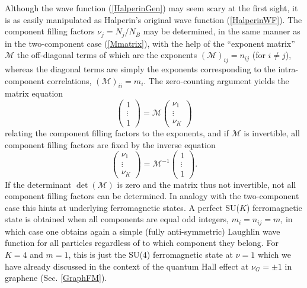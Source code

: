 \documentclass[10pt]{book}
\newcommand{\Mmath}{\mathcal{M}}
\newcommand{\beq}{\begin{equation}}
\newcommand{\eeq}{\end{equation}}
\begin{document}
Although the wave function (\ref{HalperinGen})
may seem scary at the first sight, it is as easily manipulated as Halperin's original wave function
(\ref{HalperinWF}). The component filling factors $\nu_j=N_j/N_B$ may be determined, in the same manner
as in the two-component case (\ref{Mmatrix}), with the help of the ``exponent matrix'' 
$\Mmath$ the off-diagonal terms of which are the exponents $(\Mmath)_{ij}=n_{ij}$ (for $i\neq j$), whereas 
the diagonal terms are simply the exponents corresponding to the intra-component correlations,
$(\Mmath)_{ii}=m_i$. The zero-counting argument yields the matrix equation
\beq\label{MmatrixK}
\left(\begin{array}{c} 1 \\ \vdots \\ 1\end{array}\right) = \Mmath
\left(\begin{array}{c} \nu_1 \\ \vdots \\ \nu_K\end{array}\right) 
\eeq
relating the component filling factors to the exponents, and if $\Mmath$ is invertible, all component
filling factors are fixed by the inverse equation
\beq\label{MmatrixKinv}
\left(\begin{array}{c} \nu_1 \\ \vdots \\ \nu_K \end{array}\right) = \Mmath^{-1}
\left(\begin{array}{c} 1 \\ \vdots \\ 1 \end{array}\right) .
\eeq
If the determinant $\det(\Mmath)$ is zero and the matrix thus not invertible, not all component filling factors can
be determined. In analogy with the two-component case this hints at underlying ferromagnetic states.
A perfect SU($K$) ferromagnetic state is obtained when all components are equal odd integers, $m_i=n_{ij}=m$, in
which case one obtains again a simple (fully anti-symmetric)
Laughlin wave function for all particles regardless of to which component they belong. For $K=4$ and $m=1$, this is just the
SU(4) ferromagnetic state at $\nu=1$ which we have already discussed in the context of the quantum Hall effect at $\nu_G=\pm 1$
in graphene (Sec. \ref{GraphFM}). 
\end{document}
